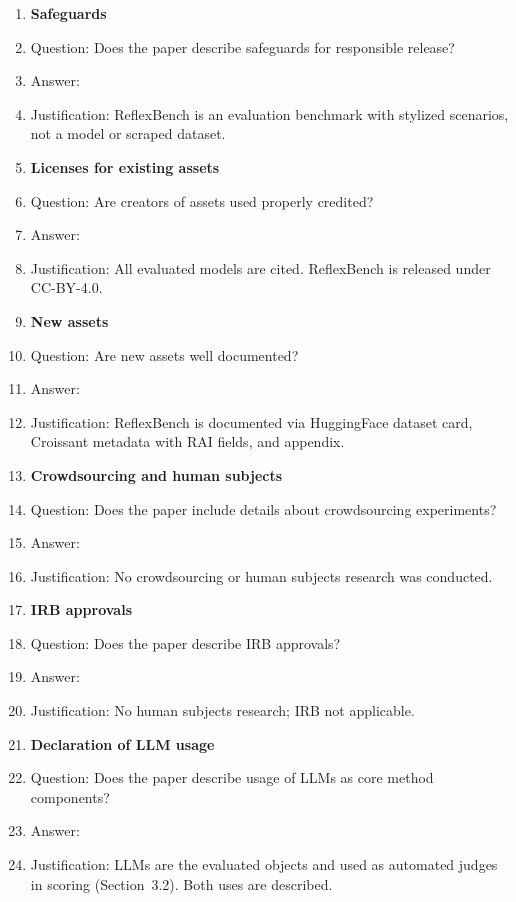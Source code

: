 \documentclass{article}
\begin{document}
\begin{enumerate}
\item {\bf Safeguards}
    \item[] Question: Does the paper describe safeguards for responsible release?
    \item[] Answer: \answerNA{}
    \item[] Justification: ReflexBench is an evaluation benchmark with stylized scenarios, not a model or scraped dataset.

\item {\bf Licenses for existing assets}
    \item[] Question: Are creators of assets used properly credited?
    \item[] Answer: \answerYes{}
    \item[] Justification: All evaluated models are cited. ReflexBench is released under CC-BY-4.0.

\item {\bf New assets}
    \item[] Question: Are new assets well documented?
    \item[] Answer: \answerYes{}
    \item[] Justification: ReflexBench is documented via HuggingFace dataset card, Croissant metadata with RAI fields, and appendix.

\item {\bf Crowdsourcing and human subjects}
    \item[] Question: Does the paper include details about crowdsourcing experiments?
    \item[] Answer: \answerNA{}
    \item[] Justification: No crowdsourcing or human subjects research was conducted.

\item {\bf IRB approvals}
    \item[] Question: Does the paper describe IRB approvals?
    \item[] Answer: \answerNA{}
    \item[] Justification: No human subjects research; IRB not applicable.

\item {\bf Declaration of LLM usage}
    \item[] Question: Does the paper describe usage of LLMs as core method components?
    \item[] Answer: \answerYes{}
    \item[] Justification: LLMs are the evaluated objects and used as automated judges in scoring (Section~3.2). Both uses are described.

\end{enumerate}
\end{document}
